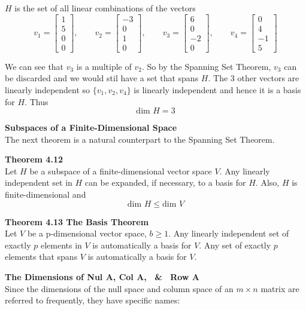 \documentclass{article}
\begin{document}
  $ H $ is the set of all linear combinations of the vectors
  \[
    v_1=\begin{bmatrix}
      1\\
      5\\
      0\\
      0
    \end{bmatrix}, \qquad v_2=\begin{bmatrix}
      -3\\
      0\\
      1\\
      0
    \end{bmatrix}, \qquad v_3=\begin{bmatrix}
      6\\
      0\\
      -2\\
      0
    \end{bmatrix}, \qquad v_4=\begin{bmatrix}
      0\\
      4\\
      -1\\
      5
    \end{bmatrix}
  \]
  
  We can see that $ v_3 $ is a multiple of $ v_2 $. So by the Spanning Set Theorem, $ v_3 $ can be discarded and we would stil have a set that spans $ H $. The 3 other vectors are linearly independent so $ \{ v_1,v_2,v_4 \} $ is linearly independent and hence it is a basis for $ H $. Thus
  \[
    \boxed{\text{dim }H=3}
  \]

  \textbf{Subspaces of a Finite-Dimensional Space}\\
  The next theorem is a natural counterpart to the Spanning Set Theorem.

  \textbf{Theorem 4.12}\\
  Let $ H $ be a subspace of a finite-dimensional vector space $ V $. Any linearly independent set in $ H $ can be expanded, if necessary, to a basis for $ H $. Also, $ H $ is finite-dimensional and 
  \[
    \text{dim }H\le \text{dim }V
  \]
 
  \textbf{Theorem 4.13 The Basis Theorem}\\
  Let $ V $ be a p-dimensional vector space, $ b \ge 1 $. Any linearly independent set of exactly $ p $ elements in $ V $ is automatically a basis for $ V $. Any set of exactly $ p $ elements that spans $ V $ is automatically a basis for $ V $.
  
  \textbf{The Dimensions of Nul A, Col A, ~\&~ Row A}\\
  Since the dimensions of the null space and column space of an $ m \times n $ matrix are referred to frequently, they have specific names:
\end{document}
